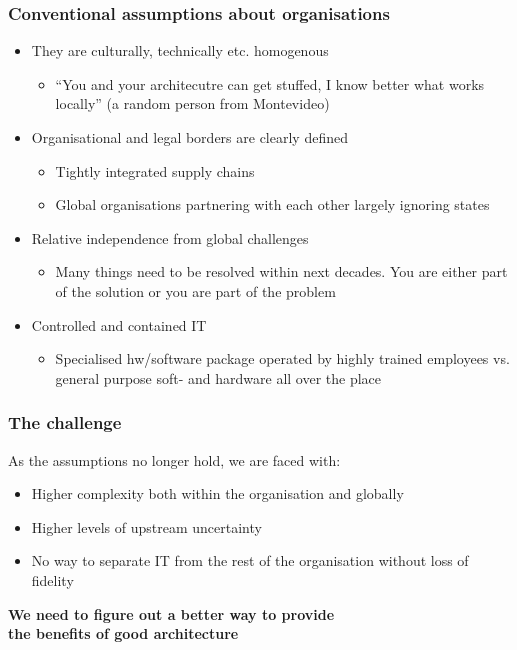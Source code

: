 \documentclass[10pt, compress]{beamer}
\begin{document}
\begin{frame}[fragile]
  \frametitle{Conventional assumptions about organisations}
  \begin{itemize}
  	\item They are culturally, technically etc. homogenous
	\begin{itemize}
		\item \enquote{You and your architecutre can get stuffed, I know better what works locally} (a random person from Montevideo)
	\end{itemize}
	\item Organisational and legal borders are clearly defined 
	\begin{itemize}
		\item Tightly integrated supply chains
		\item Global organisations partnering with each other largely ignoring states
	\end{itemize}

	\item Relative independence from global challenges
	\begin{itemize}
		\item Many things need to be resolved within next decades. You are either part of the solution or you are part of the problem
	\end{itemize}

	\item Controlled and contained IT
	\begin{itemize}
		\item Specialised hw/software package operated by highly trained employees vs. general purpose soft- and hardware all over the place
	\end{itemize}
	
  \end{itemize}
  
\end{frame}

\begin{frame}[fragile]
  \frametitle{The challenge}
  
  As the assumptions no longer hold, we are faced with:
  \begin{itemize}
		\item Higher complexity both within the organisation and globally
		\item Higher levels of upstream uncertainty
		\item No way to separate IT from the rest of the organisation without loss of fidelity
  \end{itemize}
  
  \begin{center}
  	\textbf{We need to figure out a better way to provide \\the benefits of good architecture}
  \end{center}
\end{frame}
\end{document}
